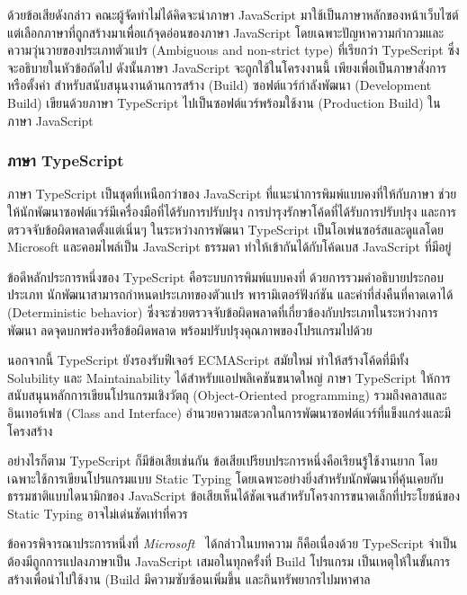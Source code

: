 \documentclass[12pt,one side,openright,a4paper]{cpe-thesis-th}
\newcommand{\thaijustify}[1]{%
  \par\hspace{30pt}\justifying
  #1
}
\begin{document}
            \thaijustify{
                ด้วยข้อเสียดังกล่าว คณะผู้จัดทำไม่ได้คิดจะนำภาษา JavaScript มาใช้เป็นภาษาหลักของหน้าเว็บไซต์ แต่เลือกภาษาที่ถูกสร้างมาเพื่อแก้จุดอ่อนของภาษา JavaScript โดยเฉพาะปัญหาความกำกวมและความวุ่นวายของประเภทตัวแปร (Ambiguous and non-strict type) ที่เรียกว่า TypeScript ซึ่งจะอธิบายในหัวข้อถัดไป ดังนั้นภาษา JavaScript จะถูกใช้ในโครงงานนี้ เพียงเพื่อเป็นภาษาสั่งการหรือตั้งค่า สำหรับสนับสนุนงานด้านการสร้าง (Build) ซอฟต์แวร์กำลังพัฒนา (Development Build) เขียนด้วยภาษา TypeScript ไปเป็นซอฟต์แวร์พร้อมใช้งาน (Production Build) ในภาษา JavaScript
            }
        \subsubsection{ภาษา TypeScript}
            \thaijustify{
                ภาษา TypeScript เป็นชุดที่เหนือกว่าของ JavaScript ที่แนะนำการพิมพ์แบบคงที่ให้กับภาษา ช่วยให้นักพัฒนาซอฟต์แวร์มีเครื่องมือที่ได้รับการปรับปรุง การบำรุงรักษาโค้ดที่ได้รับการปรับปรุง และการตรวจจับข้อผิดพลาดตั้งแต่เนิ่นๆ ในระหว่างการพัฒนา TypeScript เป็นโอเพ่นซอร์สและดูแลโดย Microsoft และคอมไพล์เป็น JavaScript ธรรมดา ทำให้เข้ากันได้กับโค้ดเบส JavaScript ที่มีอยู่~\cite{hejlsbergts, microsoftts}
            }
            \thaijustify{
                ข้อดีหลักประการหนึ่งของ TypeScript คือระบบการพิมพ์แบบคงที่ ด้วยการรวมคำอธิบายประกอบประเภท นักพัฒนาสามารถกำหนดประเภทของตัวแปร พารามิเตอร์ฟังก์ชัน และค่าที่ส่งคืนที่คาดเดาได้ (Deterministic behavior) ซึ่งจะช่วยตรวจจับข้อผิดพลาดที่เกี่ยวข้องกับประเภทในระหว่างการพัฒนา ลดจุดบกพร่องหรือข้อผิดพลาด พร้อมปรับปรุงคุณภาพของโปรแกรมไปด้วย~\cite{cherny19ts, microsoftts}
            }
            \thaijustify{  
                นอกจากนี้ TypeScript ยังรองรับฟีเจอร์ ECMAScript สมัยใหม่ ทำให้สร้างโค้ดที่มีทั้ง Solubility และ Maintainability ได้สำหรับแอปพลิเคชันขนาดใหญ่ ภาษา TypeScript ให้การสนับสนุนหลักการเขียนโปรแกรมเชิงวัตถุ (Object-Oriented programming) รวมถึงคลาสและอินเทอร์เฟซ (Class and Interface) อำนวยความสะดวกในการพัฒนาซอฟต์แวร์ที่แข็งแกร่งและมีโครงสร้าง~\cite{hejlsbergts}
            }
            \thaijustify{
                อย่างไรก็ตาม TypeScript ก็มีข้อเสียเช่นกัน ข้อเสียเปรียบประการหนึ่งคือเรียนรู้ใช้งานยาก โดยเฉพาะใช้การเขียนโปรแกรมแบบ Static Typing โดยเฉพาะอย่างยิ่งสำหรับนักพัฒนาที่คุ้นเคยกับธรรมชาติแบบไดนามิกของ JavaScript ข้อเสียเห็นได้ชัดเจนสำหรับโครงการขนาดเล็กที่ประโยชน์ของ Static Typing อาจไม่เด่นชัดเท่าที่ควร~\cite{cherny19ts}
            }
            \thaijustify{
                ข้อควรพิจารณาประการหนึ่งที่ \textit{Microsoft}~\cite{microsoftts} ได้กล่าวในบทความ ก็คือเนื่องด้วย TypeScript จำเป็นต้องมีถูกการแปลงภาษาเป็น JavaScript เสมอในทุกครั้งที่ Build โปรแกรม เป็นเหตุให้ในขั้นการสร้างเพื่อนำไปใช้งาน (Build มีความซับซ้อนเพิ่มขึ้น และกินทรัพยากรไปมหาศาล
            }
\end{document}
